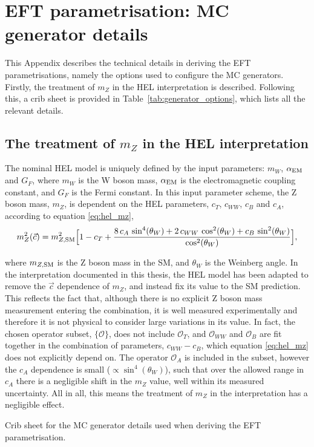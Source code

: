 \chapter{EFT parametrisation: MC generator details}\label{app:generator_options}
\vspace{-.5cm}
This Appendix describes the technical details in deriving the EFT parametrisations, namely the options used to configure the MC generators. Firstly, the treatment of $m_Z$ in the HEL interpretation is described. Following this, a crib sheet is provided in Table~\ref{tab:generator_options}, which lists all the relevant details.
\vspace{-.3cm}
\section{The treatment of $m_Z$ in the HEL interpretation}
The nominal HEL model is uniquely defined by the input parameters: $m_W$, $\alpha_{\rm{EM}}$ and $G_F$, where $m_W$ is the W boson mass, $\alpha_{\rm{EM}}$ is the electromagnetic coupling constant, and $G_F$ is the Fermi constant. In this input parameter scheme, the Z boson mass, $m_Z$, is dependent on the HEL parameters, $c_T$, $c_{WW}$, $c_B$ and $c_A$, according to equation \ref{eq:hel_mz},
\begin{equation}\label{eq:hel_mz}
    m_Z^2(\vec{c}) = m_{Z,\rm{SM}}^2 \Big[ 1-c_T+\frac{8\,c_A\,\sin^4(\theta_W)+2\,c_{WW}\,\cos^2(\theta_W)+c_B\,\sin^2(\theta_W)}{\cos^2(\theta_W)} \Big],
\end{equation}

\noindent
where $m_{Z,\rm{SM}}$ is the Z boson mass in the SM, and $\theta_W$ is the Weinberg angle. In the interpretation documented in this thesis, the HEL model has been adapted to remove the $\vec{c}$ dependence of $m_Z$, and instead fix its value to the SM prediction. This reflects the fact that, although there is no explicit Z boson mass measurement entering the combination, it is well measured experimentally and therefore it is not physical to consider large variations in its value. In fact, the chosen operator subset, $\{\mathcal{O}\}$, does not include $\mathcal{O}_T$, and $\mathcal{O}_{WW}$ and $\mathcal{O}_B$ are fit together in the combination of parameters, $c_{WW}-c_B$, which equation \ref{eq:hel_mz} does not explicitly depend on. The operator $\mathcal{O}_A$ is included in the subset, however the $c_A$ dependence is small ($\propto \sin^4(\theta_W)$), such that over the allowed range in $c_A$ there is a negligible shift in the $m_Z$ value, well within its measured uncertainty. All in all, this means the treatment of $m_Z$ in the interpretation has a negligible effect.

\begin{table}[htb!]
  \centering
  \footnotesize
  \renewcommand{\arraystretch}{1.5}
  \setlength{\tabcolsep}{6pt}
  \caption[MC generator details for deriving the EFT parametrisation]
  {
    Crib sheet for the MC generator details used when deriving the EFT parametrisation.
  }
  \label{tab:generator_options}
  
\end{table}
